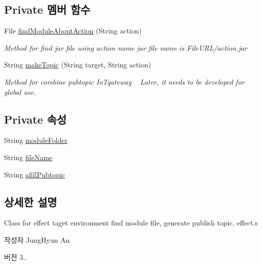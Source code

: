\subsection*{Private 멤버 함수}
\begin{DoxyCompactItemize}
\item 
File \mbox{\hyperlink{classcom_1_1github_1_1aites_1_1framework_1_1executor_1_1_effector_a96119f173f888fdde3f37a3557d6f6ce}{find\+Module\+About\+Action}} (String action)
\begin{DoxyCompactList}\small\item\em Method for find jar file using action name jar file name is File\+U\+R\+L/action.\+jar \end{DoxyCompactList}\item 
String \mbox{\hyperlink{classcom_1_1github_1_1aites_1_1framework_1_1executor_1_1_effector_aa41e495f98690fcbed0bd8aded38d52a}{make\+Topic}} (String target, String action)
\begin{DoxyCompactList}\small\item\em Method for combine pubtopic Io\+Tgateway ~\newline
Later, it needs to be developed for global use. \end{DoxyCompactList}\end{DoxyCompactItemize}
\subsection*{Private 속성}
\begin{DoxyCompactItemize}
\item 
String \mbox{\hyperlink{classcom_1_1github_1_1aites_1_1framework_1_1executor_1_1_effector_abd3712d877c8ff7227be30b6503f2475}{module\+Folder}}
\item 
String \mbox{\hyperlink{classcom_1_1github_1_1aites_1_1framework_1_1executor_1_1_effector_a8df1631ecb6613a1e323f131369cd0b0}{file\+Name}}
\item 
String \mbox{\hyperlink{classcom_1_1github_1_1aites_1_1framework_1_1executor_1_1_effector_ada537f3c9fe303eb9503821843b08b30}{afill\+Pubtopic}}
\end{DoxyCompactItemize}


\subsection{상세한 설명}
Class for effect taget environment find module file, generate publish topic, effect.\+s 

\begin{DoxyAuthor}{작성자}
Jung\+Hyun An 
\end{DoxyAuthor}
\begin{DoxyVersion}{버전}
3.. 
\end{DoxyVersion}


